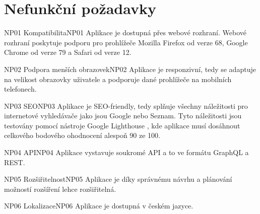 \section{Nefunkční požadavky}
\label{sc:non_func_req}

\begin{requirment}{NP01 Kompatibilita}{NP01}
    Aplikace je dostupná přes webové rozhraní. Webové rozhraní poskytuje podporu pro prohlížeče Mozilla Firefox od verze 68, Google Chrome od verze 79 a Safari od verze 12.
\end{requirment}

\begin{requirment}{NP02 Podpora menších obrazovek}{NP02}
    Aplikace je responzivní, tedy se adaptuje na velikost obrazovky uživatele a podporuje dané prohlížeče na mobilních telefonech.
\end{requirment}

\begin{requirment}{NP03 SEO}{NP03}
    Aplikace je SEO-friendly, tedy splňuje všechny náležitosti pro internetové vyhledávače jako jsou Google nebo Seznam. Tyto náležitosti jsou testovány pomocí nástroje Google Lighthouse \cite{googlellc_2019_lighthouse}, kde aplikace musí dosáhnout celkového bodového ohodnocení alespoň 90 ze 100.
\end{requirment}

\begin{requirment}{NP04 API}{NP04}
    Aplikace vystavuje soukromé API a to ve formátu GraphQL a REST.
\end{requirment}

\begin{requirment}{NP05 Rozšiřitelnost}{NP05}
    Aplikace je díky správnému návrhu a plánování možností rozšíření lehce rozšiřitelná.
\end{requirment}

\begin{requirment}{NP06 Lokalizace}{NP06}
    Aplikace je dostupná v českém jazyce.
\end{requirment}

